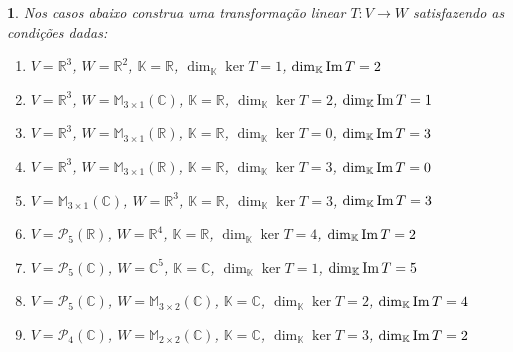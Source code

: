 \documentclass[12pt]{exam}
\newtheorem{exercicio}{}
\newcommand{\im}{{\rm Im\,}}
\newcommand{\real}{\mathbb{R}}
\newcommand{\complex}{\mathbb{C}}
\newcommand{\cp}[1]{\mathbb{#1}}
\begin{document}
\begin{exercicio}
  Nos casos abaixo construa uma transforma\c{c}\~ao linear $T : V \to W$ satisfazendo as condi\c{c}\~oes dadas:
  \begin{enumerate}[label=({\alph*})]
    \item $V = \real^3$, $W = \real^2$, $\cp{K} = \real$, $\dim_\cp{K} \ker T = 1$, $\dim_\cp{K} \im T = 2$
    \item $V = \real^3$, $W = \cp{M}_{3\times 1}(\complex)$, $\cp{K} = \real$, $\dim_\cp{K} \ker T = 2$, $\dim_\cp{K} \im T = 1$
    \item $V = \real^3$, $W = \cp{M}_{3\times 1}(\real)$, $\cp{K} = \real$, $\dim_\cp{K} \ker T = 0$, $\dim_\cp{K} \im T = 3$
    \item $V = \real^3$, $W = \cp{M}_{3\times 1}(\real)$, $\cp{K} = \real$, $\dim_\cp{K} \ker T = 3$, $\dim_\cp{K} \im T = 0$
    \item $V = \cp{M}_{3\times 1}(\complex)$, $W = \real^3$, $\cp{K} = \real$, $\dim_\cp{K} \ker T = 3$, $\dim_\cp{K} \im T = 3$
    \item $V = \mathcal{P}_5(\real)$, $W = \real^4$, $\cp{K} = \real$, $\dim_\cp{K} \ker T = 4$, $\dim_\cp{K} \im T = 2$
    \item $V = \mathcal{P}_5(\complex)$, $W = \complex^5$, $\cp{K} = \complex$, $\dim_\cp{K} \ker T = 1$, $\dim_\cp{K} \im T = 5$
    \item $V = \mathcal{P}_5(\complex)$, $W = \cp{M}_{3\times 2}(\complex)$, $\cp{K} = \complex$, $\dim_\cp{K} \ker T = 2$, $\dim_\cp{K} \im T = 4$
    \item $V = \mathcal{P}_4(\complex)$, $W = \cp{M}_{2\times 2}(\complex)$, $\cp{K} = \complex$, $\dim_\cp{K} \ker T = 3$, $\dim_\cp{K} \im T = 2$
  \end{enumerate}
\end{exercicio}
\end{document}
